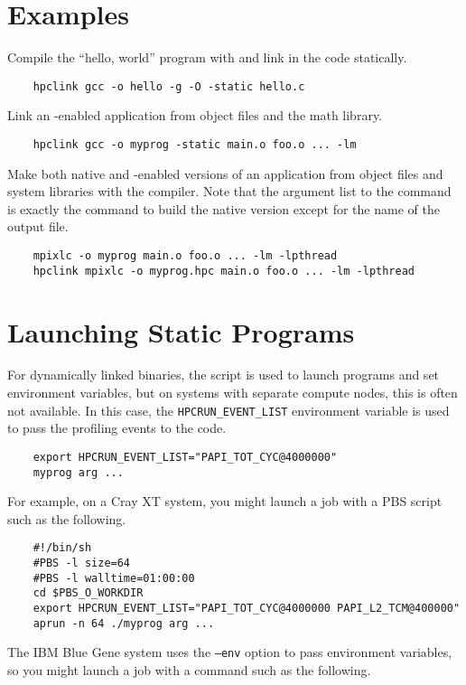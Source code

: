 \documentclass[english]{article}
\begin{document}
\section{Examples}

Compile the ``hello, world'' program with  and link in the
 code statically.

\begin{verbatim}
    hpclink gcc -o hello -g -O -static hello.c
\end{verbatim}
%
Link an -enabled application from object files and the
math library.

\begin{verbatim}
    hpclink gcc -o myprog -static main.o foo.o ... -lm
\end{verbatim}
%
Make both native and -enabled versions of an application
from object files and system libraries with the 
compiler.  Note that the argument list to the  command
is exactly the command to build the native version except for the name
of the output file.

\begin{verbatim}
    mpixlc -o myprog main.o foo.o ... -lm -lpthread
    hpclink mpixlc -o myprog.hpc main.o foo.o ... -lm -lpthread
\end{verbatim}


\section{Launching Static Programs}

For dynamically linked binaries, the  script is used to
launch programs and set environment variables, but on systems with
separate compute nodes, this is often not available.  In this case, the
\texttt{HPCRUN\_EVENT\_LIST} environment variable is used to pass the
profiling events to the  code.

\begin{verbatim}
    export HPCRUN_EVENT_LIST="PAPI_TOT_CYC@4000000"
    myprog arg ...
\end{verbatim}
%
For example, on a Cray XT system, you might launch a job with a PBS
script such as the following.

\begin{verbatim}
    #!/bin/sh
    #PBS -l size=64
    #PBS -l walltime=01:00:00
    cd $PBS_O_WORKDIR
    export HPCRUN_EVENT_LIST="PAPI_TOT_CYC@4000000 PAPI_L2_TCM@400000"
    aprun -n 64 ./myprog arg ...
\end{verbatim}
%
The IBM Blue Gene system uses the \texttt{--env} option to pass
environment variables, so you might launch a job with a command
such as the following.
\end{document}
